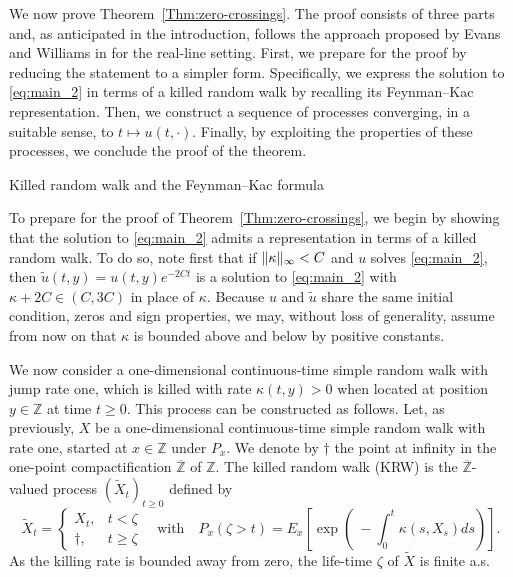 \documentclass[12pt,reqno,oneside]{amsart}
\makeatletter
\numberwithin{equation}{section}
\renewcommand\subsection{\@startsection{subsection}{2}%
  \z@{-.5\linespacing\@plus-.7\linespacing}{.5\linespacing}%
  {\normalfont\scshape}}
\theoremstyle{definition}
\theoremstyle{remark}
\newcommand{\Z}{\mathbb{Z}}
\newcommand{\OZ}{\overline{\mathbb{Z}}}
\DeclarePairedDelimiter{\norm}{\lVert}{\rVert}
\makeatother
\begin{document}
We now prove Theorem~\ref{Thm:zero-crossings}. The proof consists of three parts and, as anticipated in the introduction, follows the approach proposed by Evans and Williams in \cite{EW99} for the real-line setting. First, we prepare for the proof by reducing the statement to a simpler
form. Specifically, we express the solution to
  \eqref{eq:main_2} in terms of a killed random walk by recalling its
  Feynman–Kac representation. Then, we construct a sequence of processes
converging, in a suitable sense, to $t \mapsto u(t,\cdot)$. Finally, by
exploiting the properties of these processes, we conclude the proof of the
theorem.

\subsection{Killed random walk and the Feynman--Kac formula}
\label{sec:KRW}

To prepare for the proof of Theorem~\ref{Thm:zero-crossings}, we begin by
showing that the solution to \eqref{eq:main_2} admits a representation in
terms of a killed random walk. To do so, note first that if
$\norm{\kappa}_\infty < C$ and $u$ solves \eqref{eq:main_2}, then
$\tilde{u}(t,y)=u(t,y)e^{-2Ct}$ is a solution to \eqref{eq:main_2} with
$\kappa+2C \in (C,3C)$ in place of $\kappa$. Because $u$ and $\tilde{u}$
share the same initial condition, zeros and sign properties, we may, without
loss of generality, assume from now on that $\kappa$ is bounded above and
below by positive constants.

We now consider a one-dimensional continuous-time simple random walk with
jump rate one, which is killed with rate $\kappa(t,y)>0$ when located at
position $y \in \Z$ at time $t \geq 0$. This process can be constructed as
follows. Let, as previously, $X$ be a one-dimensional continuous-time simple
random walk with rate one, started at $x \in \Z$ under $P_x$. We denote by
$\dagger$ the point at infinity in the one-point compactification $\OZ$ of
$\Z$. The killed random walk (KRW) is the $\OZ$-valued process
$(\tilde{X}_t)_{t \geq 0}$ defined by
\begin{equation*}
  \tilde{X}_t =
  \begin{cases}
    X_t, & t < \zeta \\
    \dagger, & t \geq \zeta
  \end{cases}
  \quad
  \text{with} \quad
  P_x(\zeta > t)
  = E_x\left[\exp\left(\ - \int_0^t \kappa(s,X_s) ds \right)\right].
\end{equation*}
As the killing rate is bounded away from zero, the life-time $\zeta$ of
$\tilde{X}$ is finite a.s.
\end{document}
